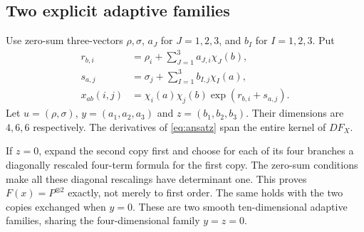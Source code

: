 \documentclass[11pt]{article}
\theoremstyle{definition}\newtheorem{definition}[theorem]{Definition}
\begin{document}
\subsection{Two explicit adaptive families}
Use zero-sum three-vectors $\rho,\sigma$, $a_J$ for $J=1,2,3$, and $b_I$ for $I=1,2,3$. Put
\begin{align}
r_{b,i}&=\rho_i+\sum_{J=1}^3 a_{J,i}\chi_J(b),\label{eq:params-r}\\
s_{a,j}&=\sigma_j+\sum_{I=1}^3 b_{I,j}\chi_I(a),\label{eq:params-s}\\
x_{ab}(i,j)&=\chi_i(a)\chi_j(b)\exp(r_{b,i}+s_{a,j}).\label{eq:ansatz}
\end{align}
Let $u=(\rho,\sigma)$, $y=(a_1,a_2,a_3)$ and $z=(b_1,b_2,b_3)$. Their dimensions are $4,6,6$ respectively. The derivatives of \eqref{eq:ansatz} span the entire kernel of $DF_X$.

If $z=0$, expand the second copy first and choose for each of its four branches a diagonally rescaled four-term formula for the first copy. The zero-sum conditions make all these diagonal rescalings have determinant one. This proves $F(x)=P^{\otimes2}$ exactly, not merely to first order. The same holds with the two copies exchanged when $y=0$. These are two smooth ten-dimensional adaptive families, sharing the four-dimensional family $y=z=0$.
\end{document}
